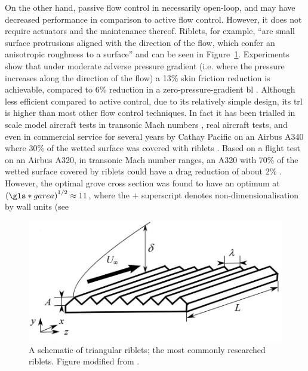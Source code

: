 On the other hand, passive flow control in necessarily open-loop, and may have decreased performance in comparison to active flow control. However, it does not require actuators and the maintenance thereof. Riblets, for example, ``are small surface protrusions aligned with the direction of the flow, which confer an anisotropic roughness to a surface'' \cite{garcia-mayoral2011} and can be seen in Figure~\ref{fig:riblets}. Experiments show that under moderate adverse pressure gradient (i.e. where the pressure increases along the direction of the flow) a 13\% skin friction reduction is achievable, compared to 6\% reduction in a zero-pressure-gradient \gls{bl} \cite{debisschop1996}. Although less efficient compared to active control, due to its relatively simple design, its \gls{trl} is higher than most other flow control techniques. In fact it has been trialled in scale model aircraft tests in transonic Mach numbers \cite{coustols1990}, real aircraft tests, and even in commercial service for several years by Cathay Pacific on an Airbus A340 where 30\% of the wetted surface was covered with riblets \cite{bechert2006}. Based on a flight test on an Airbus A320, in transonic Mach number ranges, an A320 with 70\% of the wetted surface covered by riblets could have a drag reduction of about 2\% \cite{szodruch1991}. However, the optimal grove cross section was found to have an optimum at $\left(\gls*{garea}\right)^{1 /2}\approx11$, where the $+$ superscript denotes non-dimensionalisation by wall units (see %

\begin{figure}[htbp]
\centering
\includegraphics[width=0.5\linewidth]{introduction/fig/riblets.jpeg}
\caption[Schematic of triangular riblets]{A schematic of triangular riblets; the most commonly researched riblets. Figure modified from \cite{raayai-ardakani2019}.}
\label{fig:riblets}
\end{figure}

